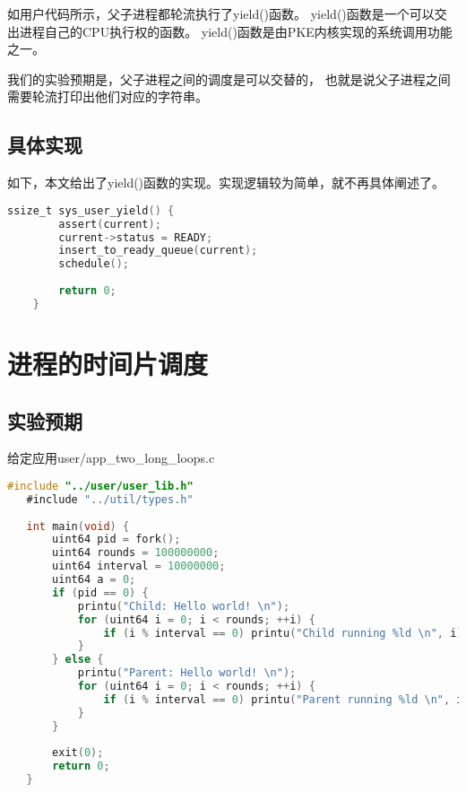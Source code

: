 如用户代码所示，父子进程都轮流执行了yield()函数。
yield()函数是一个可以交出进程自己的CPU执行权的函数。
yield()函数是由PKE内核实现的系统调用功能之一。

我们的实验预期是，父子进程之间的调度是可以交替的，
也就是说父子进程之间需要轮流打印出他们对应的字符串。

\subsection{具体实现}

如下，本文给出了yield()函数的实现。实现逻辑较为简单，就不再具体阐述了。

\begin{lstlisting}[caption={yield}, label={lst:yield}, language=C]
    ssize_t sys_user_yield() {
        assert(current);
        current->status = READY;
        insert_to_ready_queue(current);
        schedule();
    
        return 0;
    }    
\end{lstlisting}

\section{进程的时间片调度}

\subsection{实验预期}

给定应用user/app\_two\_long\_loops.c

\begin{lstlisting}[caption={用户态应用app\_two\_long\_loops.c}, label={lst:app_two_long_loops}, language=C]
   #include "../user/user_lib.h"
   #include "../util/types.h"
   
   int main(void) {
       uint64 pid = fork();
       uint64 rounds = 100000000;
       uint64 interval = 10000000;
       uint64 a = 0;
       if (pid == 0) {
           printu("Child: Hello world! \n");
           for (uint64 i = 0; i < rounds; ++i) {
               if (i % interval == 0) printu("Child running %ld \n", i);
           }
       } else {
           printu("Parent: Hello world! \n");
           for (uint64 i = 0; i < rounds; ++i) {
               if (i % interval == 0) printu("Parent running %ld \n", i);
           }
       }
   
       exit(0);
       return 0;
   }
       
\end{lstlisting}

